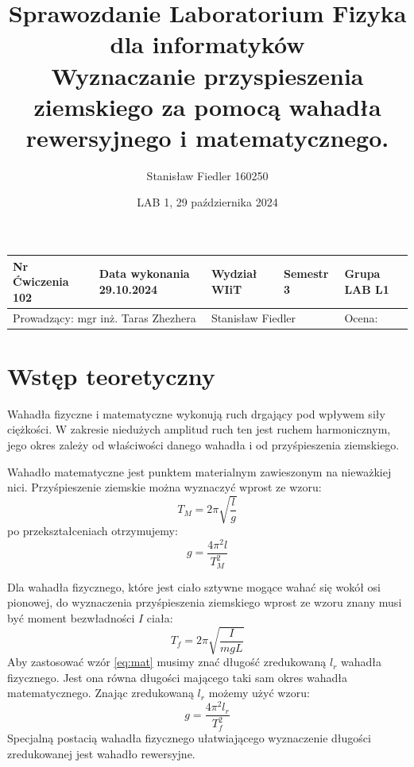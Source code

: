 \documentclass[a4paper, 11pt]{article}
\title{%
        \vspace{-1cm}
       \large Sprawozdanie Laboratorium Fizyka dla informatyków \\
       \huge Wyznaczanie przyspieszenia ziemskiego za pomocą wahadła rewersyjnego i matematycznego.}
\author{Stanisław Fiedler 160250}
\date{LAB 1, 29 października 2024}
\begin{document}
\begin{table}
	\begin{adjustwidth}{-0.25\textwidth}{-0.25\textwidth}
		\begin{center}
			\begin{tabular}{|l|l|l|l|l|}
				\hline
				Nr Ćwiczenia 102                                             & Data wykonania 29.10.2024                 & Wydział WIiT & Semestr 3 & Grupa LAB L1 \\
				\hline
				\multicolumn{2}{|l|}{ Prowadzący: mgr inż. Taras Zhezhera  } & \multicolumn{2}{|l|}{ Stanisław Fiedler } & Ocena:                                  \\
				\hline
			\end{tabular}
		\end{center}
	\end{adjustwidth}
\end{table}

\maketitle

\section{Wstęp teoretyczny}\label{sec:wstep} %
Wahadła fizyczne i matematyczne wykonują ruch drgający pod wpływem siły ciężkości.
W zakresie niedużych amplitud ruch ten jest ruchem harmonicznym,
jego okres zależy od właściwości danego wahadła i od przyśpieszenia ziemskiego.

Wahadło matematyczne jest punktem materialnym zawieszonym na nieważkiej nici.
Przyśpieszenie ziemskie można wyznaczyć wprost ze wzoru:
\begin{equation}\label{eq:mat}
	T_M = 2\pi\sqrt{\frac{l}{g}}
\end{equation}
po przekształceniach otrzymujemy:
\begin{equation}\label{eq:g_mat}
	g = \frac{4\pi^2l}{T^2_M}
\end{equation}

Dla wahadła fizycznego, które jest ciało sztywne mogące wahać się wokół osi pionowej,
do wyznaczenia przyśpieszenia ziemskiego wprost ze wzoru znany musi być moment bezwładności $I$ ciała:
\[
	T_f = 2\pi\sqrt{\frac{I}{mgL}}
\]
Aby zastosować wzór \eqref{eq:mat} musimy znać długość zredukowaną $l_r$ wahadła fizycznego.
Jest ona równa długości mającego taki sam okres wahadła matematycznego.
Znając zredukowaną $l_r$ możemy użyć wzoru:
\begin{equation}\label{eq:g_rew}
	g = \frac{4\pi^2l_r}{T^2_f}
\end{equation}
Specjalną postacią wahadła fizycznego ułatwiającego wyznaczenie długości zredukowanej jest wahadło rewersyjne.
\end{document}
